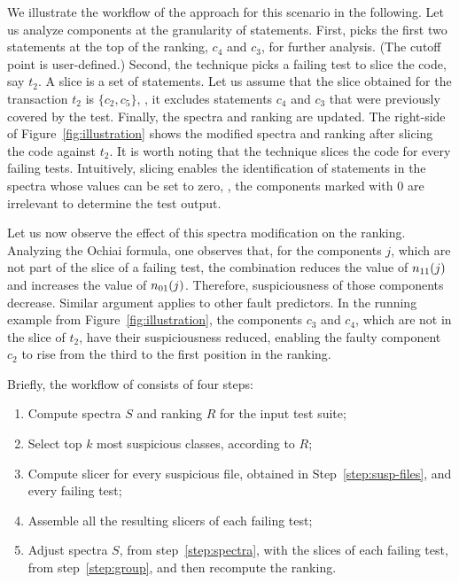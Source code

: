 \documentclass{article}
\begin{document}
We illustrate the workflow of the \comb{} approach for this scenario
in the following. Let us analyze components at the granularity of
statements.  First, \comb{} picks the first two statements at the top
of the ranking, $c_4$ and $c_3$, for further analysis.  (The cutoff
point is user-defined.) Second, the technique picks a failing test to
slice the code, say $t_2$. A slice is a set of statements. Let us
assume that the slice obtained for the transaction $t_2$ is $\{c_2,
c_5\}$, \ie, it excludes statements $c_4$ and $c_3$ that were
previously covered by the test. Finally, the spectra and ranking are
updated. The right-side of Figure~\ref{fig:illustration} shows the
modified spectra and ranking after slicing the code against $t_2$. It
is worth noting that the technique slices the code for every failing
tests. Intuitively, slicing enables the identification of statements
in the spectra whose values can be set to zero, \ie{}, the components
marked with $0$ are irrelevant to determine the test output.

Let us now observe the effect of this spectra modification on the
ranking. Analyzing the Ochiai formula, one observes that, for the
components $j$, which are not part of the slice of a failing test, the
combination reduces the value of $n_{11}(j)$ and increases the value of
$n_{01}(j)$. Therefore, suspiciousness of those components
decrease. Similar argument applies to other fault predictors. In the
running example from Figure~\ref{fig:illustration}, the components
$c_3$ and $c_4$, which are not in the slice of $t_2$, have their
suspiciousness reduced, enabling the faulty component $c_2$ to rise
from the third to the first position in the ranking.

\vspace{1ex}
Briefly, the workflow of \comb{} consists of four steps:
\begin{enumerate}
  \itemsep0em
  \item\label{step:spectra} Compute spectra $S$ and ranking $R$ for
  the input test suite;
  \item\label{step:susp-files} Select top $k$ most suspicious classes, according to $R$;
  \item\label{step:compute-slice} Compute slicer for every suspicious
    file, obtained in Step~\ref{step:susp-files}, and every failing test;
  \item\label{step:group} Assemble all the resulting slicers of each failing test;
  \item Adjust spectra $S$, from step~\ref{step:spectra}, with
    the slices of each failing test, from
    step~\ref{step:group}, and then
	recompute the ranking.
\end{enumerate}
\end{document}

